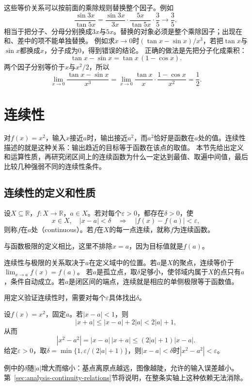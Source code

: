 这些等价关系可以按前面的乘除规则替换整个因子。例如
\[
 \frac{\sin3x}{\tan5x}=\frac{\sin3x}{3x}\cdot\frac{5x}{\tan5x}\cdot\frac35\to\frac35,
\]
相当于把分子、分母分别换成$3x$与$5x$。替换的对象必须是整个乘除因子；出现在和、差中的项不能单独替换。
例如求$x\to0$时$(\tan x-\sin x)/x^3$，若把$\tan x$与$\sin x$都换成$x$，分子成为$0$，得到错误的结论。
正确的做法是先把分子化成乘积：
\[
 \tan x-\sin x=\tan x\,(1-\cos x).
\]
两个因子分别等价于$x$与$x^2/2$，所以
\[
 \lim_{x\to0}\frac{\tan x-\sin x}{x^3}=\lim_{x\to0}\frac{\tan x}x\cdot\frac{1-\cos x}{x^2}=\frac12.
\]
\section{连续性}
\label{sec:ru-continuity}
\label{sec:analysis-local-models}
\label{sec:analysis-metric-continuity-extrema}

对$f(x)=x^2$，输入$x$接近$a$时，输出接近$a^2$，而$a^2$恰好是函数在$a$处的值。连续性描述的就是这种关系：输出趋近的目标等于函数在该点的取值。
本节先给出定义和运算性质，再研究闭区间上的连续函数为什么一定达到最值、取遍中间值，最后比较几种强弱不同的连续性条件。

\subsection{连续性的定义和性质}
\label{sec:ru-continuity-definition}

\begin{definition}[连续]
\label{def:analysis-continuity}
设$X\subseteq\mathbb R$，$f:X\to\mathbb R$，$a\in X$。若对每个$\varepsilon>0$，都存在$\delta>0$，使
\[
 x\in X,\quad|x-a|<\delta\quad\Longrightarrow\quad|f(x)-f(a)|<\varepsilon,
\]
则称$f$在$a$处（continuous）。若$f$在$X$的每一点连续，就称$f$为连续函数。
\end{definition}
与函数极限的定义相比，这里不排除$x=a$，因为目标值就是$f(a)$。

连续性与极限的关系取决于$a$在定义域中的位置。若$a$是$X$的聚点，连续等价于$\lim_{x\to a}f(x)=f(a)$。
若$a$是孤立点，取$\delta$足够小，使邻域内属于$X$的点只有$a$，条件自动成立。若$a$是闭区间的端点，连续就是相应的单侧极限等于函数值。

用定义验证连续性时，需要对每个$\varepsilon$具体找出$\delta$。
\begin{example}[平方函数在每一点连续]
\label{ex:analysis-square-pointwise-continuity}
设$f(x)=x^2$，固定$a$。若$|x-a|<1$，则
\[
 |x+a|\leq|x-a|+2|a|<2|a|+1,
\]
从而
\[
 |x^2-a^2|=|x-a|\,|x+a|\leq(2|a|+1)|x-a|.
\]
给定$\varepsilon>0$，取$\delta=\min\{1,\varepsilon/(2|a|+1)\}$，则$|x-a|<\delta$时$|x^2-a^2|<\varepsilon$。
\end{example}
例中的$\delta$随$|a|$增大而缩小：基点离原点越远，图像越陡，允许的输入误差越小。第~\ref{sec:analysis-continuity-relations}节将说明，在整条实轴上这种依赖无法消除。

